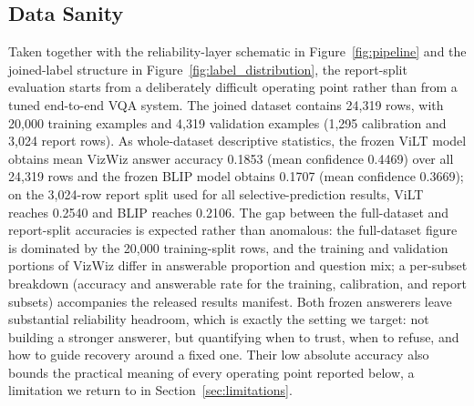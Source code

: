 \documentclass{ieeeaccess}
\newcommand{\vilt}{ViLT}
\newcommand{\blip}{BLIP}
\begin{document}
\subsection{Data Sanity}
Taken together with the reliability-layer schematic in Figure~\ref{fig:pipeline} and the joined-label structure in Figure~\ref{fig:label_distribution}, the report-split evaluation starts from a deliberately difficult operating point rather than from a tuned end-to-end VQA system. The joined dataset contains 24{,}319 rows, with 20{,}000 training examples and 4{,}319 validation examples (1{,}295 calibration and 3{,}024 report rows). As whole-dataset descriptive statistics, the frozen \vilt{} model obtains mean VizWiz answer accuracy 0.1853 (mean confidence 0.4469) over all 24{,}319 rows and the frozen \blip{} model obtains 0.1707 (mean confidence 0.3669); on the 3{,}024-row report split used for all selective-prediction results, \vilt{} reaches 0.2540 and \blip{} reaches 0.2106. The gap between the full-dataset and report-split accuracies is expected rather than anomalous: the full-dataset figure is dominated by the 20{,}000 training-split rows, and the training and validation portions of VizWiz differ in answerable proportion and question mix; a per-subset breakdown (accuracy and answerable rate for the training, calibration, and report subsets) accompanies the released results manifest.
Both frozen answerers leave substantial reliability headroom, which is exactly the setting we target: not building a stronger answerer, but quantifying when to trust, when to refuse, and how to guide recovery around a fixed one. Their low absolute accuracy also bounds the practical meaning of every operating point reported below, a limitation we return to in Section~\ref{sec:limitations}.
\end{document}
